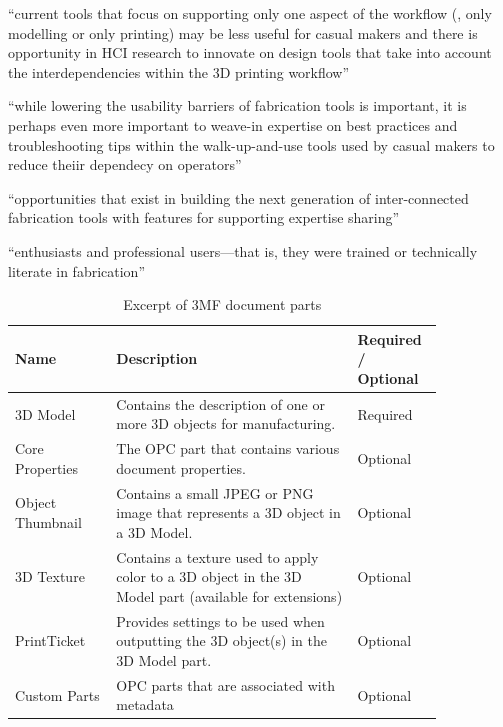 ``current tools that focus on supporting only one aspect of the workflow (\emph{\eg}, only modelling or only printing) may be less useful for casual makers and there is opportunity in HCI research to innovate on design tools that take into account the interdependencies within the 3D printing workflow''\cite{hudson_understanding_2016}

``while lowering the usability barriers of fabrication tools is important, it is perhaps even more important to weave-in expertise on best practices and troubleshooting tips within the walk-up-and-use tools used by casual makers to reduce theiir dependecy on operators''\cite{hudson_understanding_2016}

``opportunities that exist in building the next generation of inter-connected fabrication tools with features for supporting expertise sharing''\cite{hudson_understanding_2016}

``enthusiasts and professional users—that is, they were trained or technically literate in fabrication''\cite{hudson_understanding_2016}



    \begin{table}
        \renewcommand{\arraystretch}{1.3}
        \begin{tabular}{m{0.21\linewidth} m{0.5\linewidth} m{0.14\linewidth}}
            \textbf{Name} & \textbf{Description} & \textbf{Required /} \textbf{Optional} \\
            \hline
            3D Model & Contains the description of one or more 3D objects for
manufacturing. & Required \\
            Core Properties & The OPC part that contains various document properties. & Optional \\
            Object Thumbnail & Contains a small JPEG or PNG image that represents a 3D object in a 3D Model. & Optional \\
            3D Texture & Contains a texture used to apply color to a 3D object in the 3D Model part (available for extensions) & Optional \\
            PrintTicket & Provides settings to be used when outputting the 3D object(s) in the 3D Model part. & Optional \\
            Custom Parts & OPC parts that are associated with metadata & Optional
        \end{tabular}\smallskip

        \caption{Excerpt of 3MF document parts\cite[p.~4]{3mf_consortium_3mf_2025}}
        \label{doc_parts}
    \end{table}

